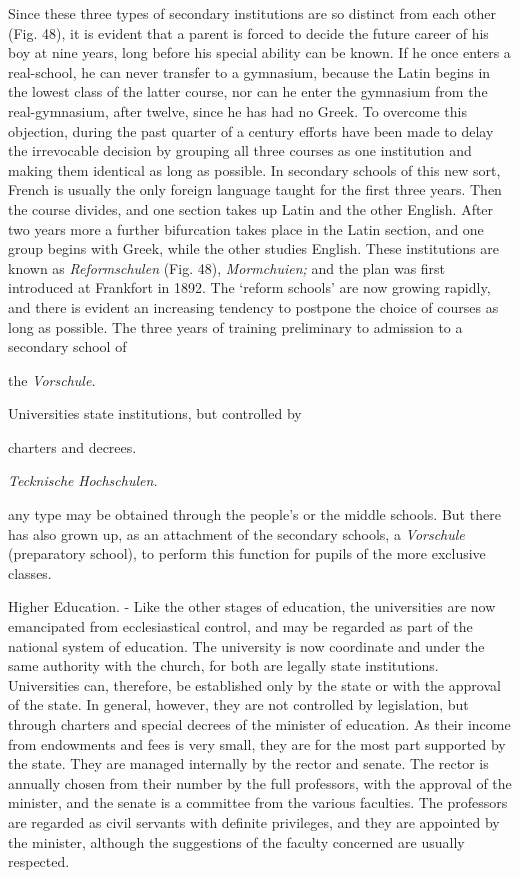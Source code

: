 \documentclass[]{book}
\begin{document}
Since these three types of secondary institutions are so distinct from each other (Fig. 48), it is evident that a parent is forced to decide the future career of his boy at nine years, long before his special ability can be known. If he once enters a real-school, he can never transfer to a gymnasium, because the Latin begins in the lowest class of the latter course, nor can he enter the gymnasium from the real-gymnasium, after twelve, since he has had no Greek. To overcome this objection, during the past quarter of a century efforts have been made to delay the irrevocable decision by grouping all three courses as one institution and making them identical as long as possible. In secondary schools of this new sort, French is usually the only foreign language taught for the first three years. Then the course divides, and one section takes up Latin and the other English. After two years more a further bifurcation takes place in the Latin section, and one group begins with Greek, while the other studies English. These institutions are known as \emph{Reformschulen} (Fig. 48), \emph{Mormchuien;} and the plan was first introduced at Frankfort in 1892. The `reform schools' are now growing rapidly, and there is evident an increasing tendency to postpone the choice of courses as long as possible. The three years of training preliminary to admission to a secondary school of

the \emph{Vorschule.}

Universities state institutions, but controlled by

charters and decrees.

\emph{Tecknische} \emph{Hochschulen.}

any type may be obtained through the people's or the middle schools. But there has also grown up, as an attachment of the secondary schools, a \emph{Vorschule} (preparatory school), to perform this function for pupils of the more exclusive classes.

Higher Education. - Like the other stages of education, the universities are now emancipated from ecclesiastical control, and may be regarded as part of the national system of education. The university is now coordinate and under the same authority with the church, for both are legally state institutions. Universities can, therefore, be established only by the state or with the approval of the state. In general, however, they are not controlled by legislation, but through charters and special decrees of the minister of education. As their income from endowments and fees is very small, they are for the most part supported by the state. They are managed internally by the rector and senate. The rector is annually chosen from their number by the full professors, with the approval of the minister, and the senate is a committee from the various faculties. The professors are regarded as civil servants with definite privileges, and they are appointed by the minister, although the suggestions of the faculty concerned are usually respected.
\end{document}
